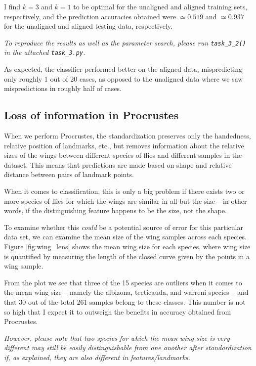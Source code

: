 I find $k = 3$ and $k = 1$ to be optimal for the unaligned and aligned training
sets, respectively, and the prediction accuracies obtained were $\simeq 0.519$
and $\simeq 0.937$ for the unaligned and aligned testing data, respectively.

\emph{To reproduce the results as well as the parameter search, please run
\texttt{task\_3\_2()} in the attached \texttt{task\_3.py}.}

As expected, the classifier performed better on the aligned data, mispredicting
only roughly 1 out of 20 cases, as opposed to the unaligned data where we
saw mispredictions in roughly half of cases.

\subsection{Loss of information in Procrustes}

When we perform Procrustes, the standardization preserves only the handedness,
relative position of landmarks, etc., but removes information about the relative
sizes of the wings between different species of flies and different samples in
the dataset. This means that predictions are made based on shape and relative
distance between pairs of landmark points.

When it comes to classification, this is only a big problem if there exists two
or more species of flies for which the wings are similar in all but the size --
in other words, if the distinguishing feature happens to be the size, not the
shape.

To examine whether this \emph{could} be a potential source of error for this
particular data set, we can examine the mean size of the wing samples across
each species. Figure \cref{fig:wing_lens} shows the mean wing size for each
species, where wing size is quantified by measuring the length of the closed
curve given by the points in a wing sample.

From the plot we see that three of the 15 species are outliers when it comes to
the mean wing size -- namely the albizona, tecticauda, and warreni species --
and that 30 out of the total 261 samples belong to these classes. This number is
not so high that I expect it to outweigh the benefits in accuracy obtained from
Procrustes.

\emph{However, please note that two species for which the mean wing size is very
different may still be easily distinguishable from one another after
standardization if, as explained, they are also different in
features/landmarks.}

